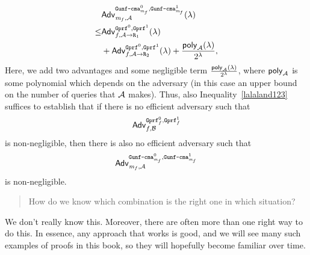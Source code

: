 \begin{align}
   \notag&\mathsf{Adv}^{\text{\texttt{Gunf\text{-}cma}}_{\mathit{{m}}_f}^0,\text{\texttt{Gunf\text{-}cma}}_{\mathit{{m}}_f}^1}_{\mathit{{m}}_f,\mathcal{A}}(\lambda)\\
   \notag\leq&\mathsf{Adv}^{\text{\texttt{Gprf}}^0,\text{\texttt{Gprf}}^1}_{f,\mathcal{A}\rightarrow\text{\texttt{R}}_1}(\lambda)\\
	       &\label{lalaland123}+\mathsf{Adv}^{\text{\texttt{Gprf}}^0,\text{\texttt{Gprf}}^1}_{f,\mathcal{A}\rightarrow\text{\texttt{R}}_2}(\lambda)+\frac{\mathsf{poly}_{\mathcal{A}}(\lambda)}{2^\lambda},
\end{align}
Here, we add two advantages and some negligible term $\frac{\mathsf{poly}_{\mathcal{A}}(\lambda)}{2^\lambda}$, where $\mathsf{poly}_{\mathcal{A}}$ is
some polynomial which depends on the adversary (in this case an upper bound on the number of queries that $\mathcal{A}$ makes).
Thus, also Inequality~\ref{lalaland123} suffices to establish that if there is no efficient adversary such that 
\[\mathsf{Adv}^{\text{\texttt{Gprf}}_f^0,\text{\texttt{Gprf}}_f^1}_{f,\mathcal{B}}\] is non-negligible, then there is also no efficient adversary such
that \[\mathsf{Adv}^{\text{\texttt{Gunf\text{-}cma}}_{\mathit{{m}}_f}^0,\text{\texttt{Gunf\text{-}cma}}_{\mathit{{m}}_f}^1}_{\mathit{{m}}_f,\mathcal{A}}\] is non-negligible.

\begin{quote}
How do we know which combination is the right one in which situation?
\end{quote}

We don't really know this. Moreover, there are
often more than one right way to do this. In essence, any approach that works is good, and we will see many such
examples of proofs in this book,
 so they will hopefully become familiar over time.

